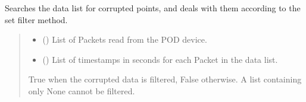 \documentclass[letterpaper,10pt,english]{sphinxmanual}
\begin{document}
\begin{fulllineitems}
\begin{fulllineitems}
\end{fulllineitems}


\begin{fulllineitems}
\label{\detokenize{Morelia.Stream.Collect:Morelia.Stream.Collect.DataHose.Hose._Filter}}
\pysigstartsignatures
{}
\pysigstopsignatures
\sphinxAtStartPar
Searches the data list for corrupted points, and deals with them         according to the set filter method.
\begin{quote}\begin{description}
\begin{itemize}
\item {} 
\sphinxAtStartPar
{} (\sphinxstyleliteralemphasis{\sphinxupquote{{[}}}{\hyperref[\detokenize{Morelia.Packets:Morelia.Packets.Packet.Packet}]{\sphinxcrossref{\sphinxstyleliteralemphasis{\sphinxupquote{Packet}}}}}\sphinxstyleliteralemphasis{\sphinxupquote{ | }}\sphinxstyleliteralemphasis{\sphinxupquote{{]}}}) \textendash{} List of Packets read from the POD device.

\item {} 
\sphinxAtStartPar
{} (\sphinxstyleliteralemphasis{\sphinxupquote{{[}}}\sphinxstyleliteralemphasis{\sphinxupquote{{]}}}) \textendash{} List of timestamps in seconds for each Packet                 in the data list.

\end{itemize}

\sphinxAtStartPar
True when the corrupted data is filtered, False otherwise. A list                 containing only None cannot be filtered.


\end{description}
\end{quote}
\end{fulllineitems}
\end{fulllineitems}
\end{document}
